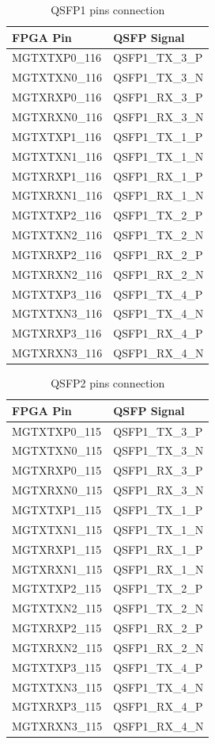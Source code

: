\documentclass[12pt,oneside,a4]{article}
\begin{document}
\begin{table}[htbp]
\centering
\begin{tabular}{@{}ll@{}}
\toprule
FPGA Pin     & QSFP Signal  \\ \midrule
MGTXTXP0\_116 & QSFP1\_TX\_3\_P \\
MGTXTXN0\_116 & QSFP1\_TX\_3\_N \\
MGTXRXP0\_116 & QSFP1\_RX\_3\_P \\
MGTXRXN0\_116 & QSFP1\_RX\_3\_N \\ \midrule
MGTXTXP1\_116 & QSFP1\_TX\_1\_P \\
MGTXTXN1\_116 & QSFP1\_TX\_1\_N \\
MGTXRXP1\_116 & QSFP1\_RX\_1\_P \\
MGTXRXN1\_116 & QSFP1\_RX\_1\_N \\ \midrule
MGTXTXP2\_116 & QSFP1\_TX\_2\_P \\
MGTXTXN2\_116 & QSFP1\_TX\_2\_N \\
MGTXRXP2\_116 & QSFP1\_RX\_2\_P \\
MGTXRXN2\_116 & QSFP1\_RX\_2\_N \\ \midrule
MGTXTXP3\_116 & QSFP1\_TX\_4\_P \\
MGTXTXN3\_116 & QSFP1\_TX\_4\_N \\
MGTXRXP3\_116 & QSFP1\_RX\_4\_P \\
MGTXRXN3\_116 & QSFP1\_RX\_4\_N \\ \bottomrule
\end{tabular}
\caption{QSFP1 pins connection}
\label{tab:qsfp1-table}
\end{table}

\begin{table}[htbp]
\centering
\begin{tabular}{@{}ll@{}}
\toprule
FPGA Pin     & QSFP Signal  \\ \midrule
MGTXTXP0\_115 & QSFP1\_TX\_3\_P \\
MGTXTXN0\_115 & QSFP1\_TX\_3\_N \\
MGTXRXP0\_115 & QSFP1\_RX\_3\_P \\
MGTXRXN0\_115 & QSFP1\_RX\_3\_N \\ \midrule
MGTXTXP1\_115 & QSFP1\_TX\_1\_P \\
MGTXTXN1\_115 & QSFP1\_TX\_1\_N \\
MGTXRXP1\_115 & QSFP1\_RX\_1\_P \\
MGTXRXN1\_115 & QSFP1\_RX\_1\_N \\ \midrule
MGTXTXP2\_115 & QSFP1\_TX\_2\_P \\
MGTXTXN2\_115 & QSFP1\_TX\_2\_N \\
MGTXRXP2\_115 & QSFP1\_RX\_2\_P \\
MGTXRXN2\_115 & QSFP1\_RX\_2\_N \\ \midrule
MGTXTXP3\_115 & QSFP1\_TX\_4\_P \\
MGTXTXN3\_115 & QSFP1\_TX\_4\_N \\
MGTXRXP3\_115 & QSFP1\_RX\_4\_P \\
MGTXRXN3\_115 & QSFP1\_RX\_4\_N \\ \bottomrule
\end{tabular}
\caption{QSFP2 pins connection}
\label{tab:qsfp2-table}
\end{table}
\end{document}
